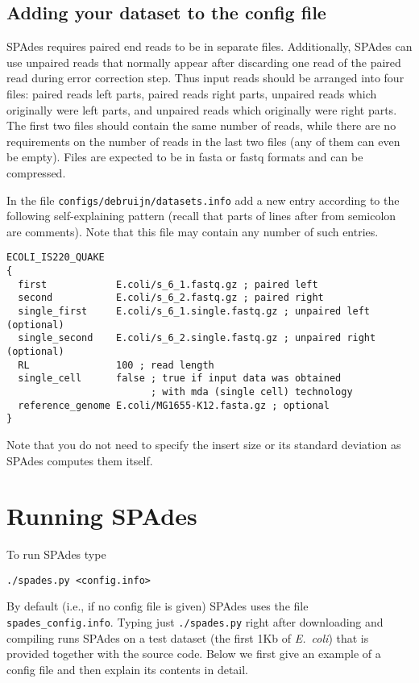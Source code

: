 \documentclass{article}
\def\spades{SPAdes}
\def\bh{BayesHammer}
\def\ecoli{\it E.~coli}
\begin{document}

\subsection{Adding your dataset to the config file}\label{subsec:datasets}
{\spades} requires paired end reads to be in separate files.
Additionally, {\spades} can use unpaired reads that normally appear after discarding one read of the paired read during error correction step.
Thus input reads should be arranged into four files: paired reads left parts, paired reads right parts, unpaired reads which originally were left parts, and
unpaired reads which originally were right parts. The first two files should contain the same number of reads, while
there are no requirements on the number of reads in the last two files (any of them can even be empty).
Files are expected to be in fasta or fastq formats and can be compressed.

In the file {\tt configs/debruijn/datasets.info} add a new entry according to the following self-explaining pattern (recall that parts of lines after from
semicolon are comments). Note that this file may contain any number of such entries.
\begin{lstlisting}
ECOLI_IS220_QUAKE
{
  first            E.coli/s_6_1.fastq.gz ; paired left
  second           E.coli/s_6_2.fastq.gz ; paired right
  single_first     E.coli/s_6_1.single.fastq.gz ; unpaired left (optional)
  single_second    E.coli/s_6_2.single.fastq.gz ; unpaired right (optional)
  RL               100 ; read length
  single_cell      false ; true if input data was obtained 
                         ; with mda (single cell) technology
  reference_genome E.coli/MG1655-K12.fasta.gz ; optional
}
\end{lstlisting}
Note that you do not need to specify the insert size or its standard deviation as {\spades}
computes them itself.

\section{Running {\spades}}
To run {\spades} type
\begin{lstlisting}
./spades.py <config.info>
\end{lstlisting}
By default (i.e., if no config file is given) {\spades} uses the file {\tt spades\_config.info}. 
Typing just {\tt ./spades.py} right after downloading and compiling runs {\spades}
on a test dataset (the first 1Kb of {\ecoli}) that is provided together with the source code.
Below we first give an example of a config file
and then explain its contents in detail.
\end{document}
